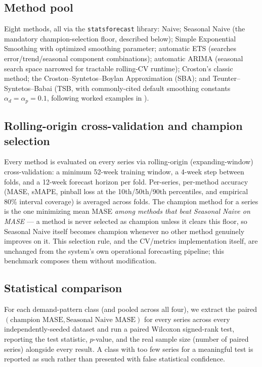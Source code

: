 \documentclass[11pt]{article}
\begin{document}
\subsection{Method pool}

Eight methods, all via the \texttt{statsforecast} library: Naive; Seasonal Naive (the
mandatory champion-selection floor, described below); Simple Exponential Smoothing with
optimized smoothing parameter; automatic ETS (searches error/trend/seasonal component
combinations); automatic ARIMA (seasonal search space narrowed for tractable rolling-CV
runtime); Croston's classic method; the Croston--Syntetos--Boylan Approximation (SBA); and
Teunter--Syntetos--Babai (TSB, with commonly-cited default smoothing constants
$\alpha_d = \alpha_p = 0.1$, following worked examples in
\citet{teunter2011intermittent}).

\subsection{Rolling-origin cross-validation and champion selection}

Every method is evaluated on every series via rolling-origin (expanding-window)
cross-validation: a minimum 52-week training window, a 4-week step between folds, and a
12-week forecast horizon per fold. Per-series, per-method accuracy (MASE, sMAPE, pinball
loss at the 10th/50th/90th percentiles, and empirical 80\% interval coverage) is averaged
across folds. The champion method for a series is the one minimizing mean MASE
\emph{among methods that beat Seasonal Naive on MASE} --- a method is never selected as
champion unless it clears this floor, so Seasonal Naive itself becomes champion whenever
no other method genuinely improves on it. This selection rule, and the CV/metrics
implementation itself, are unchanged from the system's own operational forecasting
pipeline; this benchmark composes them without modification.

\subsection{Statistical comparison}

For each demand-pattern class (and pooled across all four), we extract the paired
$(\text{champion MASE}, \text{Seasonal Naive MASE})$ for every series across every
independently-seeded dataset and run a paired Wilcoxon signed-rank test, reporting the
test statistic, $p$-value, and the real sample size (number of paired series) alongside
every result. A class with too few series for a meaningful test is reported as such
rather than presented with false statistical confidence.
\end{document}
